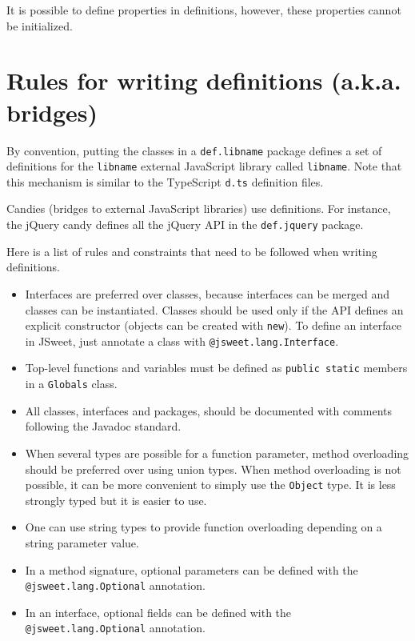 \documentclass[a4paper]{report}
\begin{document}
It is possible to define properties in definitions, however, these properties cannot be initialized.

\section{Rules for writing definitions (a.k.a. bridges)}

By convention, putting the classes in a \texttt{def.libname} package defines a set of definitions for the \texttt{libname} external JavaScript library called \texttt{libname}. Note that this mechanism is similar to the TypeScript \texttt{d.ts} definition files.

Candies (bridges to external JavaScript libraries) use definitions. For instance, the jQuery candy defines all the jQuery API in the \texttt{def.jquery} package.

Here is a list of rules and constraints that need to be followed when writing definitions.

\begin{itemize}
\item Interfaces are preferred over classes, because interfaces can be merged and classes can be instantiated. Classes should be used only if the API defines an explicit constructor (objects can be created with \texttt{new}). To define an interface in JSweet, just annotate a class with \texttt{@jsweet.lang.Interface}.
\item Top-level functions and variables must be defined as \texttt{public static} members in a \texttt{Globals} class. 
\item All classes, interfaces and packages, should be documented with comments following the Javadoc standard.
\item When several types are possible for a function parameter, method overloading should be preferred over using union types. When method overloading is not possible, it can be more convenient to simply use the \texttt{Object} type. It is less strongly typed but it is easier to use.
\item One can use string types to provide function overloading depending on a string parameter value.
\item In a method signature, optional parameters can be defined with the \texttt{@jsweet.lang.Optional} annotation. 
\item In an interface, optional fields can be defined with the \texttt{@jsweet.lang.Optional} annotation.
\end{itemize}
\end{document}

